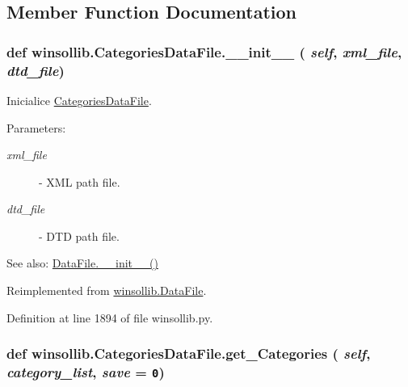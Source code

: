 \subsection{Member Function Documentation}
\hypertarget{classwinsollib_1_1CategoriesDataFile_cd08ce6d213ed244d0c27fc9af77bceb}{
\subsubsection[\_\-\_\-init\_\-\_\-]{\setlength{\rightskip}{0pt plus 5cm}def winsollib.Categories\-Data\-File.\_\-\_\-init\_\-\_\- ( {\em self},  {\em xml\_\-file},  {\em dtd\_\-file})}}
\label{classwinsollib_1_1CategoriesDataFile_cd08ce6d213ed244d0c27fc9af77bceb}


Inicialice \hyperlink{classwinsollib_1_1CategoriesDataFile}{Categories\-Data\-File}. 

\begin{Desc}
\item[Parameters:]
\begin{description}
\item[{\em xml\_\-file}]- XML path file. \item[{\em dtd\_\-file}]- DTD path file.\end{description}
\end{Desc}
\begin{Desc}
\item[See also:]\hyperlink{classwinsollib_1_1DataFile_22c2b3c07b3991b6c2300719eccd9687}{Data\-File.\_\-\_\-init\_\-\_\-()} \end{Desc}


Reimplemented from \hyperlink{classwinsollib_1_1DataFile_22c2b3c07b3991b6c2300719eccd9687}{winsollib.Data\-File}.

Definition at line 1894 of file winsollib.py.\hypertarget{classwinsollib_1_1CategoriesDataFile_8f60a8fa652006b7f272e3b90b1d4eef}{
\subsubsection[get\_\-Categories]{\setlength{\rightskip}{0pt plus 5cm}def winsollib.Categories\-Data\-File.get\_\-Categories ( {\em self},  {\em category\_\-list},  {\em save} = {\tt 0})}}
\label{classwinsollib_1_1CategoriesDataFile_8f60a8fa652006b7f272e3b90b1d4eef}


